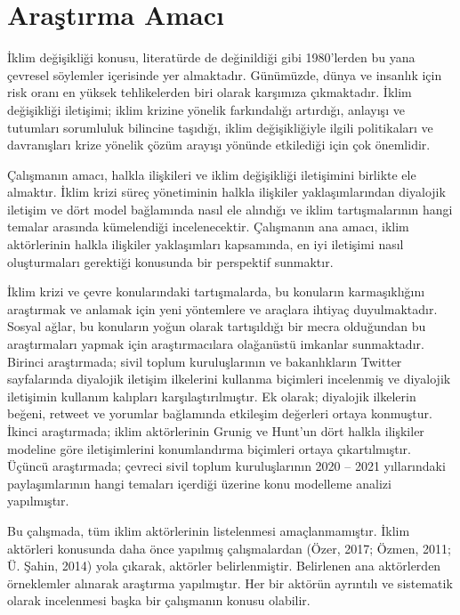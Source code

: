 \documentclass[
]{book}
\begin{document}
\hypertarget{araux15ftux131rma-amacux131}{%
\section{Araştırma Amacı}\label{araux15ftux131rma-amacux131}}

İklim değişikliği konusu, literatürde de değinildiği gibi 1980'lerden bu yana çevresel söylemler içerisinde yer almaktadır. Günümüzde, dünya ve insanlık için risk oranı en yüksek tehlikelerden biri olarak karşımıza çıkmaktadır. İklim değişikliği iletişimi; iklim krizine yönelik farkındalığı artırdığı, anlayışı ve tutumları sorumluluk bilincine taşıdığı, iklim değişikliğiyle ilgili politikaları ve davranışları krize yönelik çözüm arayışı yönünde etkilediği için çok önemlidir.

Çalışmanın amacı, halkla ilişkileri ve iklim değişikliği iletişimini birlikte ele almaktır. İklim krizi süreç yönetiminin halkla ilişkiler yaklaşımlarından diyalojik iletişim ve dört model bağlamında nasıl ele alındığı ve iklim tartışmalarının hangi temalar arasında kümelendiği incelenecektir. Çalışmanın ana amacı, iklim aktörlerinin halkla ilişkiler yaklaşımları kapsamında, en iyi iletişimi nasıl oluşturmaları gerektiği konusunda bir perspektif sunmaktır.

İklim krizi ve çevre konularındaki tartışmalarda, bu konuların karmaşıklığını araştırmak ve anlamak için yeni yöntemlere ve araçlara ihtiyaç duyulmaktadır. Sosyal ağlar, bu konuların yoğun olarak tartışıldığı bir mecra olduğundan bu araştırmaları yapmak için araştırmacılara olağanüstü imkanlar sunmaktadır. Birinci araştırmada; sivil toplum kuruluşlarının ve bakanlıkların Twitter sayfalarında diyalojik iletişim ilkelerini kullanma biçimleri incelenmiş ve diyalojik iletişimin kullanım kalıpları karşılaştırılmıştır. Ek olarak; diyalojik ilkelerin beğeni, retweet ve yorumlar bağlamında etkileşim değerleri ortaya konmuştur. İkinci araştırmada; iklim aktörlerinin Grunig ve Hunt'un dört halkla ilişkiler modeline göre iletişimlerini konumlandırma biçimleri ortaya çıkartılmıştır. Üçüncü araştırmada; çevreci sivil toplum kuruluşlarının 2020 -- 2021 yıllarındaki paylaşımlarının hangi temaları içerdiği üzerine konu modelleme analizi yapılmıştır.

Bu çalışmada, tüm iklim aktörlerinin listelenmesi amaçlanmamıştır. İklim aktörleri konusunda daha önce yapılmış çalışmalardan (Özer, 2017; Özmen, 2011; Ü. Şahin, 2014) yola çıkarak, aktörler belirlenmiştir. Belirlenen ana aktörlerden örneklemler alınarak araştırma yapılmıştır. Her bir aktörün ayrıntılı ve sistematik olarak incelenmesi başka bir çalışmanın konusu olabilir.
\end{document}
